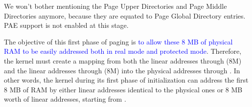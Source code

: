 We won't bother mentioning the Page Upper Directories and Page Middle Directories anymore,
because they are equated to Page Global Directory entries. PAE support is not enabled at
this stage.

The objective of this first phase of paging is \textcolor{blue}{to allow these 8 MB of
  physical RAM to be easily addressed both in real mode and protected mode}. Therefore,
the kernel must create a mapping from both the linear addresses  through
 (8M) and the linear addresses  through
 (8M) into the physical addresses  through
. In other words, the kernel during its first phase of initialization can
address the first 8 MB of RAM by either linear addresses identical to the physical ones or
8 MB worth of linear addresses, starting from .

